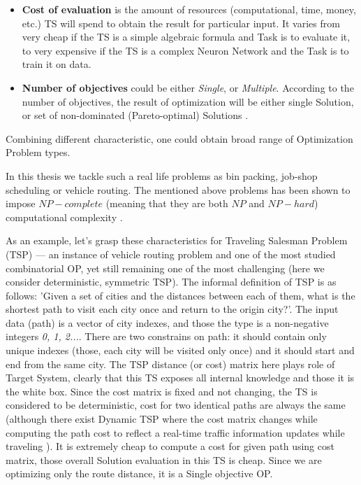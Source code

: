 \begin{itemize}[itemsep=8pt]
	\item \textbf{Cost of evaluation} is the amount of resources (computational, time, money, etc.) TS will spend to obtain the result for particular input. It varies from very cheap if the TS is a simple algebraic formula and Task is to evaluate it, to very expensive if the TS is a complex Neuron Network and the Task is to train it on data.

	\item \textbf{Number of objectives} could be either \textit{Single}, or \textit{Multiple}. According to the number of objectives, the result of optimization will be either single Solution, or set of non-dominated (Pareto-optimal) Solutions \cite{deb2014multi}.

\end{itemize}


Combining different characteristic, one could obtain broad range of Optimization Problem types.


In this thesis we tackle such a real life problems as bin packing, job-shop scheduling or vehicle routing.
The mentioned above problems has been shown to impose $NP-complete$ (meaning that they are both $NP$ and $NP-hard$) computational complexity \cite{garey1979computers}.


As an example, let's grasp these characteristics for Traveling Salesman Problem (TSP) \cite{applegate2006traveling} — an instance of vehicle routing problem and one of the most studied combinatorial OP, yet still remaining one of the most challenging (here we consider deterministic, symmetric TSP).
The informal definition of TSP is as follows: 'Given a set of cities and the distances between each of them, what is the shortest path to visit each city once and return to the origin city?'.
The input data (path) is a vector of city indexes, and those the type is a non-negative integers \textit{0, 1, 2...}.
There are two constrains on path: it should contain only unique indexes (those, each city will be visited only once) and it should start and end from the same city. 
The TSP distance (or cost) matrix here plays role of Target System, clearly that this TS exposes all internal knowledge and those it is the white box.
Since the cost matrix is fixed and not changing, the TS is considered to be deterministic, cost for two identical paths are always the same (although there exist Dynamic TSP where the cost matrix changes while computing the path cost to reflect a real-time traffic information updates while traveling \cite{cheong2011dynamic}).
It is extremely cheap to compute a cost for given path using cost matrix, those overall Solution evaluation in this TS is cheap.
Since we are optimizing only the route distance, it is a Single objective OP.


